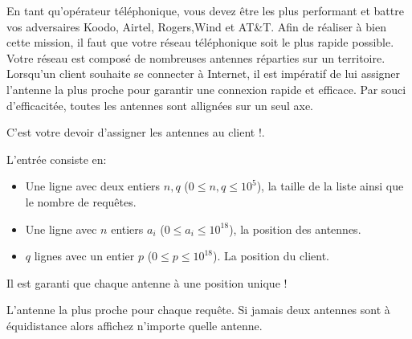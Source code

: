 

\newcommand{\maxa}{123456789}

En tant qu'opérateur téléphonique, vous devez être les plus performant et battre vos adversaires Koodo, Airtel, Rogers,Wind et AT\&T. Afin de réaliser à bien cette mission, il faut que votre réseau téléphonique soit le plus rapide possible. Votre réseau est composé de nombreuses antennes réparties sur un territoire. Lorsqu'un client souhaite se connecter à Internet, il est impératif de lui assigner l'antenne la plus proche pour garantir une connexion rapide et efficace. Par souci d'efficacitée, toutes les antennes sont allignées sur un seul axe.

C'est votre devoir d'assigner les antennes au client !.

\begin{Input}
    L'entrée consiste en:
    \begin{itemize}
        \item Une ligne avec deux entiers $n, q$ ($0\leq n, q\leq 10^5$), la taille de la liste ainsi que le nombre de requêtes.
        \item Une ligne avec $n$ entiers $a_i$ ($0  \leq a_i \leq 10^{18}$), la position des antennes.
        \item $q$ lignes avec un entier $p$ ($0 \leq p \leq 10^{18}$). La position du client.
    \end{itemize}
    Il est garanti que chaque antenne à une position unique !
\end{Input}

\begin{Output}
    L'antenne la plus proche pour chaque requête. Si jamais deux antennes sont à équidistance alors affichez n'importe quelle antenne.
\end{Output}
